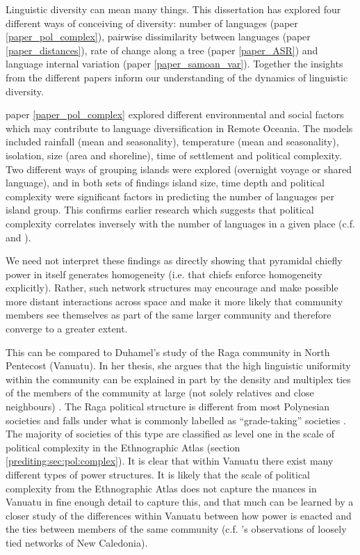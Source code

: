 \documentclass[draft,10pt]{article} %
\begin{document}
\newpage


Linguistic diversity can mean many things. This dissertation has explored four different ways of conceiving of diversity: number of languages (paper \ref{paper_pol_complex}), pairwise dissimilarity between languages (paper \ref{paper_distances}), rate of change along a tree (paper \ref{paper_ASR}) and language internal variation (paper \ref{paper_samoan_var}). Together the insights from the different papers inform our understanding of the dynamics of linguistic diversity.

paper \ref{paper_pol_complex} explored different environmental and social factors which may contribute to language diversification in Remote Oceania. The models included rainfall (mean and seasonality), temperature (mean and seasonality), isolation, size (area and shoreline), time of settlement and political complexity. Two different ways of grouping islands were explored (overnight voyage or shared language), and in both sets of findings island size, time depth and political complexity were significant factors in predicting the number of languages per island group. This confirms earlier research which suggests that political complexity correlates inversely with the number of languages in a given place (c.f. \cite{pawley2007} and \cite{curriemace2009}). 

We need not interpret these findings as directly showing that pyramidal chiefly power in itself generates homogeneity (i.e. that chiefs enforce homogeneity explicitly). Rather, such network structures may encourage and make possible more distant interactions across space and make it more likely that community members see themselves as part of the same larger community and therefore converge to a greater extent. 

This can be compared to Duhamel's study of the Raga community in North Pentecost (Vanuatu). In her thesis, she argues that the high linguistic uniformity within the community can be explained in part by the density and multiplex ties of the members of the community at large (not solely relatives and close neighbours) \citep{duhamel2020raga}. The Raga political structure is different from most Polynesian societies and falls under what is commonly labelled as ``grade-taking'' societies \citep{bonnemaison1996graded}. The majority of societies of this type are classified as level one in the scale of political complexity in the Ethnographic Atlas (section \ref{prediting:sec:pol:complex}). It is clear that within Vanuatu there exist many different types of power structures. It is likely that the scale of political complexity from the Ethnographic Atlas does not capture the nuances in Vanuatu in fine enough detail to capture this, and that much can be learned by a closer study of the differences within Vanuatu between how power is enacted and the ties between members of the same community (c.f. \cite{grace_1992_aberrant}'s observations of loosely tied networks of New Caledonia).
\end{document}
